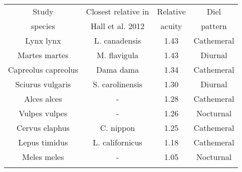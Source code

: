\begin{tabular}{cccc}
	\toprule
	Study & Closest relative in 	& Relative 	& Diel  \\	%
	species& Hall et al. 2012  		& acuity 	& pattern \\	%
	\midrule
	Lynx lynx & L. canadensis 		&1.43 	& Cathemeral \\	%
	Martes martes & M. flavigula 		&1.43 	& Diurnal 	\\	%
	Capreolus capreolus & Dama dama 	&1.34 	& Cathemeral \\	%
	Sciurus vulgaris & S. carolinensis	&1.30 	& Diurnal    \\	%
	Alces alces & -  			&1.28 	& Cathemeral \\	%
	Vulpes vulpes & -		 	&1.26 	& Nocturnal \\	%
	Cervus elaphus & C. nippon 		&1.25 	& Cathemeral \\	%
	Lepus timidus & L. californicus 	&1.18 	& Cathemeral \\ %
	Meles meles & - 			&1.05 	& Nocturnal \\	%
	\bottomrule& 
\end{tabular}
